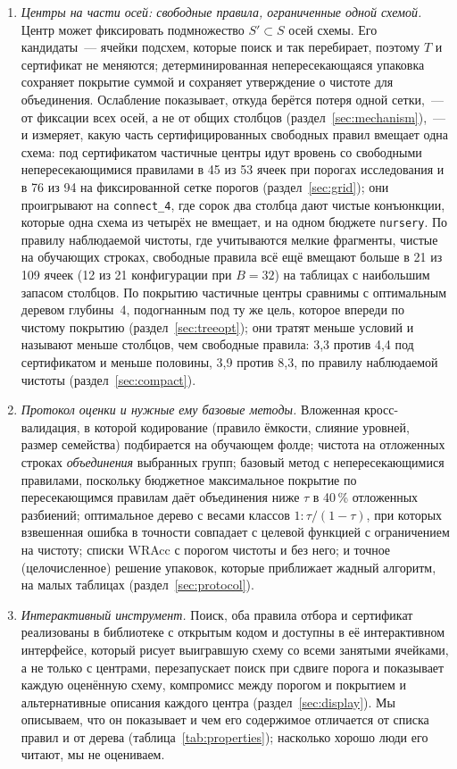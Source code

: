\documentclass[11pt]{article}
\begin{document}
\begin{enumerate}
\item \emph{Центры на части осей: свободные правила, ограниченные одной схемой.} Центр может фиксировать подмножество $S'\subset S$ осей схемы. Его кандидаты~--- ячейки подсхем, которые поиск и так перебирает, поэтому $T$ и сертификат не меняются; детерминированная непересекающаяся упаковка сохраняет покрытие суммой и сохраняет утверждение о чистоте для объединения. Ослабление показывает, откуда берётся потеря одной сетки,~--- от фиксации всех осей, а не от общих столбцов (раздел~\ref{sec:mechanism}),~--- и измеряет, какую часть сертифицированных свободных правил вмещает одна схема: под сертификатом частичные центры идут вровень со свободными непересекающимися правилами в 45 из 53 ячеек при порогах исследования и в 76 из 94 на фиксированной сетке порогов (раздел~\ref{sec:grid}); они проигрывают на \texttt{connect\_4}, где сорок два столбца дают чистые конъюнкции, которые одна схема из четырёх не вмещает, и на одном бюджете \texttt{nursery}. По правилу наблюдаемой чистоты, где учитываются мелкие фрагменты, чистые на обучающих строках, свободные правила всё ещё вмещают больше в 21 из 109 ячеек (12 из 21 конфигурации при $B=32$) на таблицах с наибольшим запасом столбцов. По покрытию частичные центры сравнимы с оптимальным деревом глубины~4, подогнанным под ту же цель, которое впереди по чистому покрытию (раздел~\ref{sec:treeopt}); они тратят меньше условий и называют меньше столбцов, чем свободные правила: 3,3 против 4,4 под сертификатом и меньше половины, 3,9 против 8,3, по правилу наблюдаемой чистоты (раздел~\ref{sec:compact}).
\item \emph{Протокол оценки и нужные ему базовые методы.} Вложенная кросс-валидация, в которой кодирование (правило ёмкости, слияние уровней, размер семейства) подбирается на обучающем фолде; чистота на отложенных строках \emph{объединения} выбранных групп; базовый метод с непересекающимися правилами, поскольку бюджетное максимальное покрытие по пересекающимся правилам даёт объединения ниже $\tau$ в 40\,\% отложенных разбиений; оптимальное дерево с весами классов $1:\tau/(1-\tau)$, при которых взвешенная ошибка в точности совпадает с целевой функцией с ограничением на чистоту; списки WRAcc с порогом чистоты и без него; и точное (целочисленное) решение упаковок, которые приближает жадный алгоритм, на малых таблицах (раздел~\ref{sec:protocol}).
\item \emph{Интерактивный инструмент.} Поиск, оба правила отбора и сертификат реализованы в библиотеке с открытым кодом и доступны в её интерактивном интерфейсе, который рисует выигравшую схему со всеми занятыми ячейками, а не только с центрами, перезапускает поиск при сдвиге порога и показывает каждую оценённую схему, компромисс между порогом и покрытием и альтернативные описания каждого центра (раздел~\ref{sec:display}). Мы описываем, что он показывает и чем его содержимое отличается от списка правил и от дерева (таблица~\ref{tab:properties}); насколько хорошо люди его читают, мы не оцениваем.
\end{enumerate}
\end{document}
